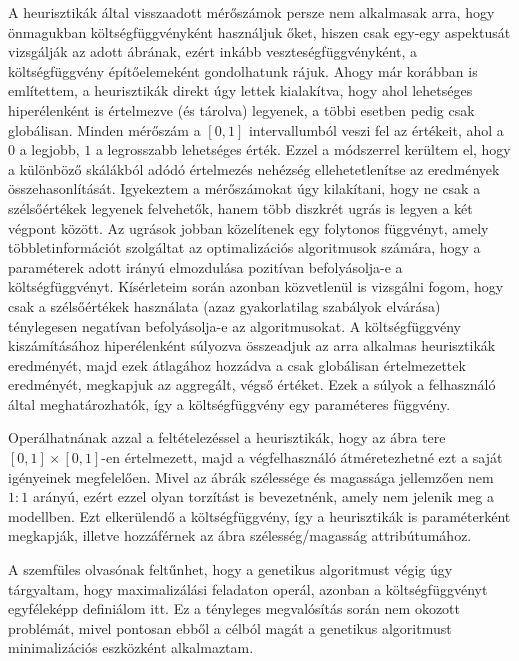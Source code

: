 A heurisztikák által visszaadott mérőszámok persze nem alkalmasak arra, hogy önmagukban költségfüggvényként használjuk őket, hiszen csak egy-egy aspektusát vizsgálják az adott ábrának, ezért inkább veszteségfüggvényként, a költségfüggvény építőelemeként gondolhatunk rájuk. Ahogy már korábban is említettem, a heurisztikák direkt úgy lettek kialakítva, hogy ahol lehetséges hiperélenként is értelmezve (és tárolva) legyenek, a többi esetben pedig csak globálisan. Minden mérőszám a $[0, 1]$ intervallumból veszi fel az értékeit, ahol a $0$ a legjobb, $1$ a legrosszabb lehetséges érték. Ezzel a módszerrel kerültem el, hogy a különböző skálákból adódó értelmezés nehézség ellehetetlenítse az eredmények összehasonlítását.  Igyekeztem a mérőszámokat úgy kilakítani, hogy ne csak a szélsőértékek legyenek felvehetők, hanem több diszkrét ugrás is legyen a két végpont között. Az ugrások jobban közelítenek egy folytonos függvényt, amely többletinformációt szolgáltat az optimalizációs algoritmusok számára, hogy a paraméterek adott irányú elmozdulása pozitívan befolyásolja-e a költségfüggvényt. Kísérleteim során azonban közvetlenül is vizsgálni fogom, hogy csak a szélsőértékek használata (azaz gyakorlatilag szabályok elvárása) ténylegesen negatívan befolyásolja-e az algoritmusokat. A költségfüggvény kiszámításához hiperélenként súlyozva összeadjuk az arra alkalmas heurisztikák eredményét, majd ezek átlagához hozzádva a csak globálisan értelmezettek eredményét, megkapjuk az aggregált, végső értéket. Ezek a súlyok a felhasználó által meghatározhatók, így a költségfüggvény egy paraméteres függvény.

\begin{note}
Operálhatnának azzal a feltételezéssel a heurisztikák, hogy az ábra tere $[0,1] \times [0,1]$-en értelmezett, majd a végfelhasználó átméretezhetné ezt a saját igényeinek megfelelően. Mivel az ábrák szélessége és magassága jellemzően nem $1:1$ arányú, ezért ezzel olyan torzítást is bevezetnénk, amely nem jelenik meg a modellben. Ezt elkerülendő a költségfüggvény, így a heurisztikák is paraméterként megkapják, illetve hozzáférnek az ábra szélesség/magasság attribútumához.
\end{note}

\begin{note}
A szemfüles olvasónak feltűnhet, hogy a genetikus algoritmust végig úgy tárgyaltam, hogy maximalizálási feladaton operál, azonban a költségfüggvényt egyféleképp definiálom itt. Ez a tényleges megvalósítás során nem okozott problémát, mivel pontosan ebből a célból magát a genetikus algoritmust minimalizációs eszközként alkalmaztam.
\end{note}


